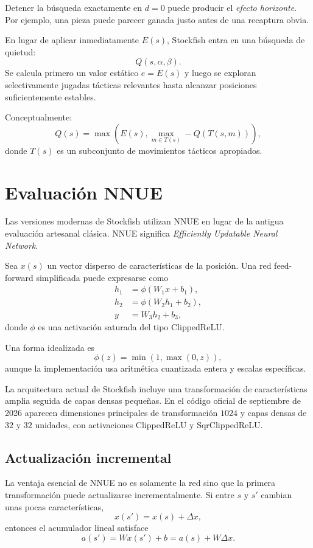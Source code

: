 \documentclass[11pt,a4paper]{article}
\begin{document}
Detener la búsqueda exactamente en $d=0$ puede producir el \emph{efecto horizonte}. Por ejemplo, una pieza puede parecer ganada justo antes de una recaptura obvia.

En lugar de aplicar inmediatamente $E(s)$, Stockfish entra en una búsqueda de quietud:
\[
Q(s,\alpha,\beta).
\]
Se calcula primero un valor estático $e=E(s)$ y luego se exploran selectivamente jugadas tácticas relevantes hasta alcanzar posiciones suficientemente estables.

Conceptualmente:
\[
Q(s)=\max\left(E(s),\max_{m\in T(s)} -Q(T(s,m))\right),
\]
donde $T(s)$ es un subconjunto de movimientos tácticos apropiados.

\section{Evaluación NNUE}

Las versiones modernas de Stockfish utilizan NNUE en lugar de la antigua evaluación artesanal clásica. NNUE significa \emph{Efficiently Updatable Neural Network}.

Sea $x(s)$ un vector disperso de características de la posición. Una red feed-forward simplificada puede expresarse como
\begin{align*}
h_1 &= \phi(W_1x+b_1),\\
h_2 &= \phi(W_2h_1+b_2),\\
y   &= W_3h_2+b_3,
\end{align*}
donde $\phi$ es una activación saturada del tipo ClippedReLU.

Una forma idealizada es
\[
\phi(z)=\min(1,\max(0,z)),
\]
aunque la implementación usa aritmética cuantizada entera y escalas específicas.

La arquitectura actual de Stockfish incluye una transformación de características amplia seguida de capas densas pequeñas. En el código oficial de septiembre de 2026 aparecen dimensiones principales de transformación $1024$ y capas densas de $32$ y $32$ unidades, con activaciones ClippedReLU y SqrClippedReLU.

\subsection{Actualización incremental}

La ventaja esencial de NNUE no es solamente la red sino que la primera transformación puede actualizarse incrementalmente. Si entre $s$ y $s'$ cambian unas pocas características,
\[
 x(s')=x(s)+\Delta x,
\]
entonces el acumulador lineal satisface
\[
 a(s')=W x(s')+b = a(s)+W\Delta x.
\]
\end{document}
